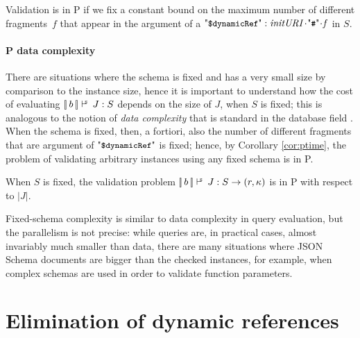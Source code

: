 \begin{corollary}\label{cor:ptime}
Validation is in P if we fix a constant bound on the maximum number of different  fragments~$f$ that appear in the argument
of a $\qddref: \key{initURI}\catHash\key{f}$ in $S$.
\end{corollary}






\paragraph{P data complexity} %


There are situations where the schema is fixed and has a very small size by comparison to the instance size, hence
it is important to understand how the cost of evaluating $\SJudg{\List{b}}{J}{S}$ depends on the size of $J$,
when $S$ is fixed; this is analogous to the notion of 
\emph{data complexity} that is standard in the database field \citep{DBLP:conf/stoc/Vardi82}.
When the schema is fixed, then, a fortiori, also the number of
different fragments that are argument of $\qddref$ is fixed; hence,
by Corollary \ref{cor:ptime}, the problem of validating
arbitrary instances using any fixed schema is in P.


\begin{corollary}\label{the:datacomplexity}
When $S$ is fixed, the validation problem $\SJudg{\List{b}}{J}{S}\Ret{r}{(r,\ps)}$ 
is in P with respect to $|J|$.
\end{corollary}


Fixed-schema complexity is similar to data complexity in query evaluation, but the parallelism is not
precise: while queries are, in practical cases, almost invariably much smaller than data, there are many situations
where JSON Schema documents are bigger than the checked instances, for example, when
complex schemas are used in order to validate function parameters.%



\section{Elimination of dynamic references} %
\label{sec:elimination}

